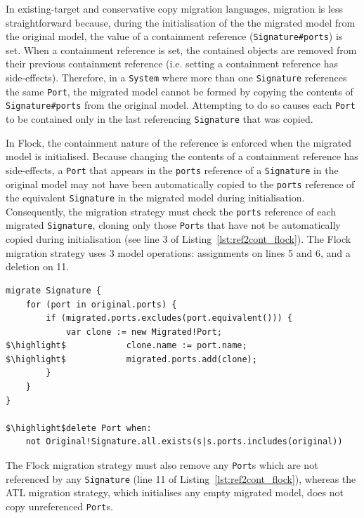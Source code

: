 In existing-target and conservative copy migration languages, migration is less straightforward because, during the initialisation of the the migrated model from the original model, the value of a containment reference (\texttt{Si\-gn\-at\-ure\#po\-r\-ts}) is set. When a containment reference is set, the contained objects are removed from their previous containment reference (i.e. setting a containment reference has side-effects). Therefore, in a \texttt{System} where more than one \texttt{Signature} references the same \texttt{Port}, the migrated model cannot be formed by copying the contents of \texttt{Signature\#ports} from the original model. Attempting to do so causes each \texttt{Port} to be contained only in the last referencing \texttt{Signature} that was copied.

In Flock, the containment nature of the reference is enforced when the migrated model is initialised. Because changing the contents of a containment reference has side-effects, a \texttt{Port} that appears in the \texttt{ports} reference of a \texttt{Signature} in the original model may not have been automatically copied to the \texttt{ports} reference of the equivalent \texttt{Signature} in the migrated model during initialisation. Consequently, the migration strategy must check the \texttt{ports} reference of each migrated \texttt{Signature}, cloning only those \texttt{Port}s that have not be automatically copied during initialisation (see line 3 of Listing~\ref{lst:ref2cont_flock}). The Flock migration strategy uses 3 model operations: assignments on lines 5 and 6, and a deletion on 11.

\begin{lstlisting}[float=tbp, caption=Migration for Change Reference to Containment in Flock, label=lst:ref2cont_flock, language=Flock, tabsize=2]
migrate Signature {
	for (port in original.ports) {
		if (migrated.ports.excludes(port.equivalent())) {
			var clone := new Migrated!Port;
$\highlight$			clone.name := port.name;
$\highlight$			migrated.ports.add(clone);
		}
	}
}

$\highlight$delete Port when:
	not Original!Signature.all.exists(s|s.ports.includes(original))
\end{lstlisting}

The Flock migration strategy must also remove any \texttt{Port}s which are not referenced by any \texttt{Signature} (line 11 of Listing~\ref{lst:ref2cont_flock}), whereas the ATL migration strategy, which initialises any empty migrated model, does not copy unreferenced \texttt{Port}s.

